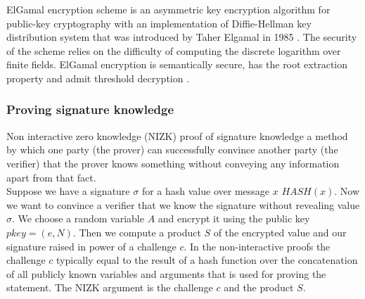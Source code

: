 \documentclass[12pt]{article}
\begin{document}
ElGamal encryption scheme  is an asymmetric key encryption algorithm for public-key cryptography with an implementation of Diffie-Hellman key distribution system  that was introduced  by Taher Elgamal in 1985 \cite{Elgamal1985}. The security of the scheme relies on the difficulty of computing the discrete logarithm over finite fields.  ElGamal encryption is semantically secure, has the root extraction property and admit threshold decryption  \cite{Groth2010}. 
\subsubsection{Proving signature knowledge}
Non interactive zero knowledge (NIZK) proof  of signature knowledge a method by which one party (the prover) can successfully convince another party (the verifier) that the prover knows something without conveying any information apart from that fact.\\

Suppose we have a signature $\sigma$ for a hash value over message $x$ $HASH(x)$. Now we want to convince a verifier that we know the signature without revealing value $\sigma$. We choose a random variable $A$ and encrypt it using the public key $pkey = (e,N)$. Then we compute a product $S$ of the encrypted value and our signature raised in power of a challenge $c$. In the non-interactive proofs the challenge $c$ typically equal to the result of a hash function over the concatenation of all publicly known variables and arguments that is used for proving the statement. The NIZK argument is the challenge $c$ and the product $S$.\\\\
\\
\end{document}
